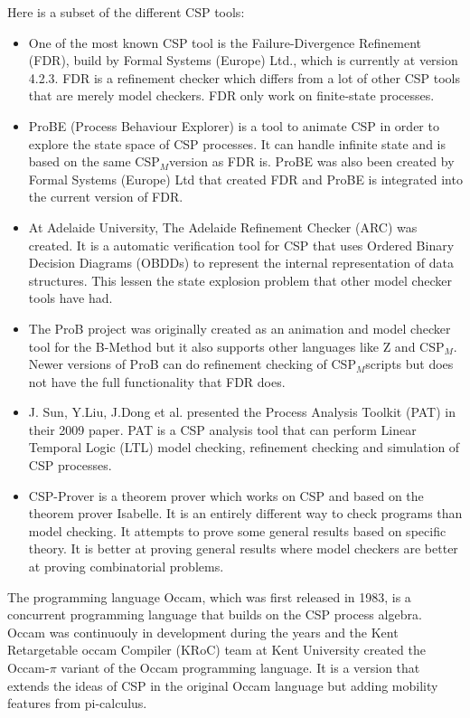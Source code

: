 \documentclass[a4paper]{report}
\newcommand{\cspm}{CSP$_M$}
\begin{document}
Here is a subset of the different CSP tools:
\begin{itemize}
\item One of the most known CSP tool is the Failure-Divergence Refinement (FDR), build by Formal Systems (Europe) Ltd., which is currently at version 4.2.3\cite{fdr}. FDR is a refinement checker which differs from a lot of other CSP tools that are merely model checkers. FDR only work on finite-state processes. 
\item ProBE (Process Behaviour Explorer)\cite{probe} is a tool to animate CSP in order to explore the state space of CSP processes. It can handle infinite state and is based on the same \cspm version as FDR is. ProBE was also been created by Formal Systems (Europe) Ltd that created FDR and ProBE is integrated into the current version of FDR. 
\item At Adelaide University, The Adelaide Refinement Checker (ARC)\cite{Parashkevov1996} was created. It is a automatic verification tool for CSP that uses Ordered Binary Decision Diagrams (OBDDs) to represent the internal representation of data structures. This lessen the state explosion problem that other model checker tools have had. 
\item The ProB project\cite{ProB}\cite{Leuschel2003} was originally created as an animation and model checker tool for the B-Method\cite{Abrial1988} but it also supports other languages like Z and \cspm. Newer versions of ProB can do refinement checking of \cspm scripts but does not have the full functionality that FDR does.
\item J. Sun, Y.Liu, J.Dong et al. presented the Process Analysis Toolkit (PAT) in their 2009 paper\cite{Sun2009}. PAT is a CSP analysis tool that can perform Linear Temporal Logic (LTL) model checking, refinement checking and simulation of CSP processes.
\item CSP-Prover\cite{Isobe2005} is a theorem prover which works on CSP and based on the theorem prover Isabelle. It is an entirely different way to check programs than model checking. It attempts to prove some general results based on specific theory. It is better at proving general results where model checkers are better at proving combinatorial problems.
\end{itemize}
The programming language Occam\cite{Occam1995}, which was first released in 1983, is a concurrent programming language that builds on the CSP process algebra. Occam was continuouly in development during the years and the Kent Retargetable occam Compiler (KRoC) team at Kent University created the Occam-$\pi$\cite{UniveristyofKent} variant of the Occam programming language. It is a version that extends the ideas of CSP in the original Occam language but adding mobility features from pi-calculus. \\\\
\end{document}
